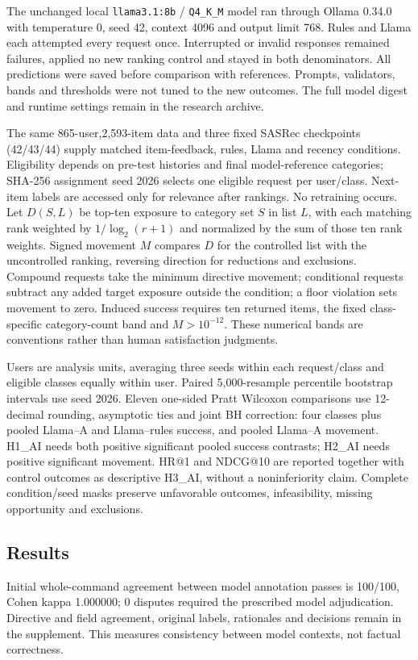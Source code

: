 \documentclass[conference]{IEEEtran}
\begin{document}
The unchanged local \texttt{llama3.1:8b} / \texttt{Q4\_K\_M} model ran through Ollama 0.34.0 with temperature 0, seed 42, context 4096 and output limit 768. Rules and Llama each attempted every request once. Interrupted or invalid responses remained failures, applied no new ranking control and stayed in both denominators. All predictions were saved before comparison with references. Prompts, validators, bands and thresholds were not tuned to the new outcomes. The full model digest and runtime settings remain in the research archive.

The same 865-user,2,593-item data and three fixed SASRec checkpoints (42/43/44) supply matched item-feedback, rules, Llama and recency conditions. Eligibility depends on pre-test histories and final model-reference categories; SHA-256 assignment seed 2026 selects one eligible request per user/class. Next-item labels are accessed only for relevance after rankings. No retraining occurs. Let $D(S,L)$ be top-ten exposure to category set $S$ in list $L$, with each matching rank weighted by $1/\log_2(r+1)$ and normalized by the sum of those ten rank weights. Signed movement $M$ compares $D$ for the controlled list with the uncontrolled ranking, reversing direction for reductions and exclusions. Compound requests take the minimum directive movement; conditional requests subtract any added target exposure outside the condition; a floor violation sets movement to zero. Induced success requires ten returned items, the fixed class-specific category-count band and $M>10^{-12}$. These numerical bands are conventions rather than human satisfaction judgments.

Users are analysis units, averaging three seeds within each request/class and eligible classes equally within user. Paired 5,000-resample percentile bootstrap intervals use seed 2026. Eleven one-sided Pratt Wilcoxon comparisons use 12-decimal rounding, asymptotic ties and joint BH correction: four classes plus pooled Llama--A and Llama--rules success, and pooled Llama--A movement. H1\_AI needs both positive significant pooled success contrasts; H2\_AI needs positive significant movement. HR@1 and NDCG@10 are reported together with control outcomes as descriptive H3\_AI, without a noninferiority claim. Complete condition/seed masks preserve unfavorable outcomes, infeasibility, missing opportunity and exclusions.

\subsection{Results}
Initial whole-command agreement between model annotation passes is 100/100, Cohen kappa 1.000000; 0 disputes required the prescribed model adjudication. Directive and field agreement, original labels, rationales and decisions remain in the supplement. This measures consistency between model contexts, not factual correctness.
\end{document}
